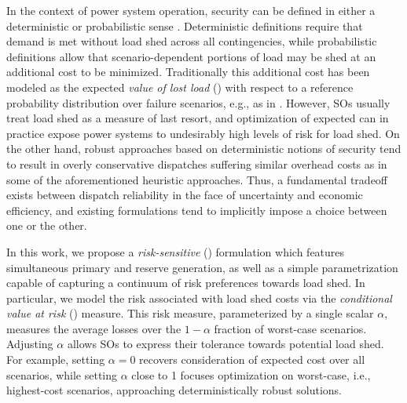 In the context of power system operation, security can be defined in either a deterministic or probabilistic sense \cite{galiana2005scheduling}. Deterministic definitions require that demand is met without load shed across all contingencies, while probabilistic definitions allow that scenario-dependent portions of load may be shed at an additional cost to be minimized. Traditionally this additional cost has been modeled as the expected \emph{value of lost load} (\VoLL{}) with respect to a reference probability distribution over failure scenarios, e.g., as in \cite{bouffard2008stochastic}. However, SOs usually treat load shed as a measure of last resort, and optimization of expected \VoLL{} can in practice expose power systems to undesirably high levels of risk for load shed. On the other hand, robust approaches based on deterministic notions of security tend to result in overly conservative dispatches suffering similar overhead costs as in some of the aforementioned heuristic approaches. Thus, a fundamental tradeoff exists between dispatch reliability in the face of uncertainty and economic efficiency, and existing \SCED{} formulations tend to implicitly impose a choice between one or the other. 

In this work, we propose a \emph{risk-sensitive} \SCED{} (\RSCED{}) formulation which features simultaneous primary and reserve generation, as well as a simple parametrization capable of capturing a continuum of risk preferences towards load shed. 
In particular, we model the risk associated with load shed costs via the \emph{conditional value at risk} (\CVaR{}) measure. This risk measure, parameterized by a single scalar $\alpha$, measures the average losses over the $1 - \alpha$ fraction of worst-case scenarios. Adjusting $\alpha$ allows SOs to express their tolerance towards potential load shed. For example, setting $\alpha = 0$ recovers consideration of expected cost over all scenarios, while setting $\alpha$ close to 1 focuses optimization on worst-case, i.e., highest-cost scenarios, approaching deterministically robust solutions.

